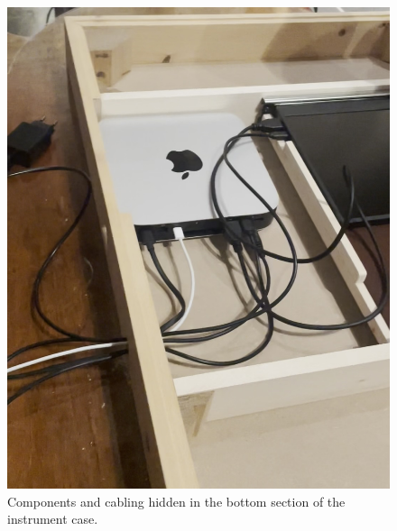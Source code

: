 \begin{figure}
    \centering
    \includegraphics[width=0.8\linewidth,trim={0 5cm 0 0},clip]{src/images/mac-mini.jpg}
    \caption{Components and cabling hidden in the bottom section of the instrument case.}
    \label{fig:mac-mini}
\end{figure}



